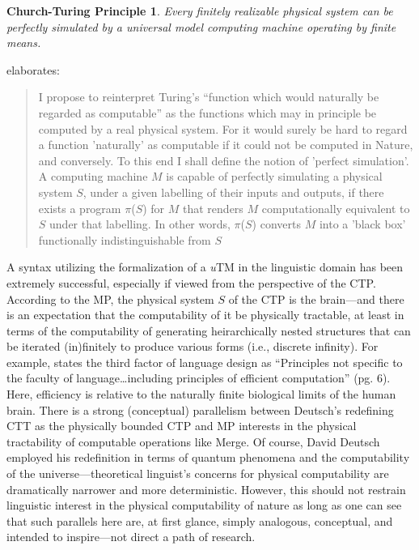 \documentclass[11pt,twoside]{article}
\begin{document}
\newtheorem*{ctprinciple}{Church-Turing Principle}
\begin{ctprinciple}
Every finitely realizable physical system can be perfectly simulated by a universal model computing machine operating by finite means.
\end{ctprinciple}

\cite[100]{deutsch:1985} elaborates:  
\begin{quotation}
I propose to reinterpret Turing's ``function which would naturally be regarded as computable'' as the functions which may in principle be computed by a real 	physical system. For it would surely be hard to regard a function 'naturally' as	computable if it could not be computed in Nature, and conversely. To this end I shall define the notion of 'perfect simulation'. A computing machine $M$ is capable of perfectly simulating a physical system $S$, under a given labelling of their inputs and outputs, if there exists a program $\pi$($S$) for $M$ that renders $M$ computationally equivalent to $S$ under that labelling. In other words, $\pi$($S$) converts $M$ into a 'black box' functionally indistinguishable from $S$
\end{quotation}

A syntax utilizing the formalization of a \textsl{u}TM in the linguistic domain has been extremely successful, especially if viewed from the perspective of the CTP. According to the MP, the physical system $S$ of the CTP is the brain---and there is an expectation that the computability of it be physically tractable, at least in terms of the computability of generating heirarchically nested structures that can be iterated (in)finitely to produce various forms (i.e., discrete infinity). For example, \cite{chomsky05threefactors} states the third factor of language design as ``Principles not specific to the faculty of language\ldots including principles of efficient computation'' (pg. 6). Here, efficiency is relative to the naturally finite biological limits of the human brain. There is a strong (conceptual) parallelism between Deutsch's redefining CTT as the physically bounded CTP and MP interests in the physical tractability of computable operations like Merge. Of course, David Deutsch employed his redefinition in terms of quantum phenomena and the computability of the universe---theoretical linguist's concerns for physical computability are dramatically narrower and more deterministic. However, this should not restrain linguistic interest in the physical computability of nature as long as one can see that such parallels here are, at first glance, simply analogous, conceptual, and intended to inspire---not direct a path of research.  
\end{document}
